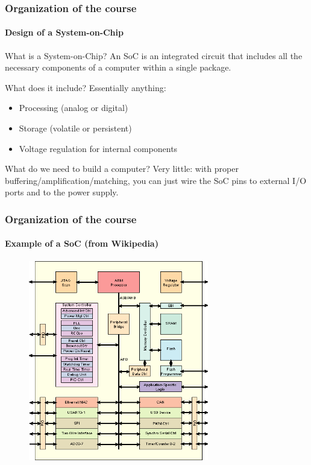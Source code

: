 \begin{frame}
\frametitle{Organization of the course}
\framesubtitle{Design of a System-on-Chip}

\begin{block}{What is a System-on-Chip?}
An SoC is an integrated circuit that includes all the necessary components of a computer within a single package.
\end{block}
\pause
\begin{block}{What does it include?}
Essentially anything:
\begin{itemize}
\item Processing (analog or digital)
\item Storage (volatile or persistent)
\item Voltage regulation for internal components
\end{itemize}
\pause
\end{block}
\begin{block}{What do we need to build a computer?}
Very little: with proper buffering/amplification/matching, you can just wire the SoC pins to external I/O ports and to the power supply.
\end{block}
\end{frame}

\begin{frame}
\frametitle{Organization of the course}
\framesubtitle{Example of a SoC (from Wikipedia)}
\begin{figure}
\includegraphics[width=0.7\textwidth]{lecture01/img/ARMSoCBlockDiagram.png}
\end{figure}
\end{frame}

